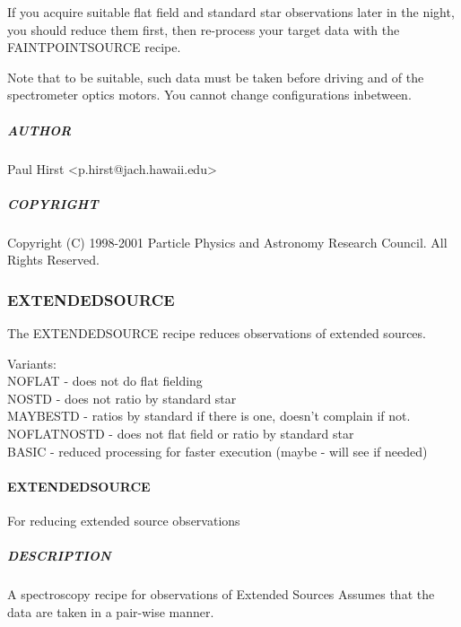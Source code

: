 \documentclass[twoside,11pt]{article}
\renewcommand{\_}{\texttt{\symbol{95}}}
\begin{document}
If you acquire suitable flat field and standard star observations
later in the night, you should reduce them first, then re-process your
target data with the FAINT\_POINT\_SOURCE recipe.



Note that to be suitable, such data must be taken before driving and
of the spectrometer optics motors. You cannot change configurations
inbetween.

\subparagraph*{AUTHOR\label{FAINT_POINT_SOURCE_NOFLAT_NOSTD_AUTHOR}}

Paul Hirst <p.hirst@jach.hawaii.edu>

\subparagraph*{COPYRIGHT\label{FAINT_POINT_SOURCE_NOFLAT_NOSTD_COPYRIGHT}}

Copyright (C) 1998-2001 Particle Physics and Astronomy Research
Council. All Rights Reserved.


\subsubsection{EXTENDED\_SOURCE}

The EXTENDED\_SOURCE recipe reduces observations of extended sources.

Variants: \\
\_NOFLAT - does not do flat fielding \\
\_NOSTD - does not ratio by standard star \\
\_MAYBESTD - ratios by standard if there is one, doesn't complain if not. \\
\_NOFLAT\_NOSTD - does not flat field or ratio by standard star \\
\_BASIC - reduced processing for faster execution (maybe - will see if needed) \\

\paragraph*{EXTENDED\_SOURCE\label{EXTENDED_SOURCE}}

For reducing extended source observations

\subparagraph*{DESCRIPTION\label{EXTENDED_SOURCE_DESCRIPTION}}

A spectroscopy recipe for observations of Extended Sources
Assumes that the data are taken in a pair-wise manner.
\end{document}
